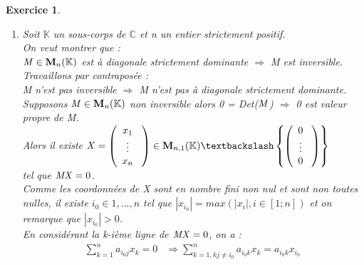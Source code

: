 \documentclass[a4paper,11pt]{article}
\newtheorem{exo}{Exercice}
\newcommand{\abs}[1]{\left\lvert#1\right\rvert}
\begin{document}
\begin{exo}
\begin{enumerate}
\begin{figure}[h]
\end{figure}
En représentant graphiquement les disques de Gerschgörin de la matrice A avec ses valeurs propres dans le plan complexe sur Scilab (probleme3.sce > valeurs\_propres(A)), on peut voir et vérifier que ces valeurs propres (en l'occurrence ses 3 valeurs propres) sont bien toutes dans l'union des disques (voir figure ci-dessus).
\item
Soit $\mathbb{K}$ un sous-corps de $\mathbb{C}$ et {\it n} un entier strictement positif. \ \\
On veut montrer que : \ \\
${\it M} \in {\bf M}_n(\mathbb{K})$ est à diagonale strictement dominante ${\Rightarrow}$  {\it M} est inversible. \ \\
Travaillons par contrapos\'{e}e : \ \\
{\it M} n'est pas inversible ${\Rightarrow}$ {\it M} n'est pas à diagonale strictement dominante. \ \\
Supposons ${\it M} \in {\bf M}_n(\mathbb{K})$ non inversible alors 0 = Det(${\it M}$) ${\Rightarrow}$ 0 est valeur propre de {\it M}. \ \\
Alors il existe $ {\it X} = \left( \begin{array}{cccc}
    x_1 \ \\
    \vdots \ \\
    x_n \ \\
   \end{array} \right) \in  {\bf M}_{n,1}(\mathbb{K}) \textbackslash \left\{\left(    \begin{array}{cccc}
    0 \ \\
    \vdots \ \\
    0 \ \\
   \end{array} \right)\right\} $  \ \\
tel que ${\it MX} = 0$. \ \\
Comme les coordonnées de {\it X} sont en nombre fini non nul et sont non toutes nulles, il existe $i_0 \in 1,...,n$ tel que $\abs{x_{i_0}} = max(\abs{x_i}, i \in [1;n])$ et on remarque que $\abs{x_{i_0}} > 0$. \ \\
En considérant la k-ième ligne de ${\it MX} = 0$, on a : \ \\
\begin{equation}
\begin{aligned}
\sum\limits_{k=1}^n a_{i_0j}x_k = 0 & \Rightarrow \sum\limits_{k=1,kj\neq i_0}^n a_{i_0k}x_k = a_{i_0k}x_{i_0} \ \\

\end{aligned}
\end{equation}
\end{enumerate}
\end{exo}
\end{document}
